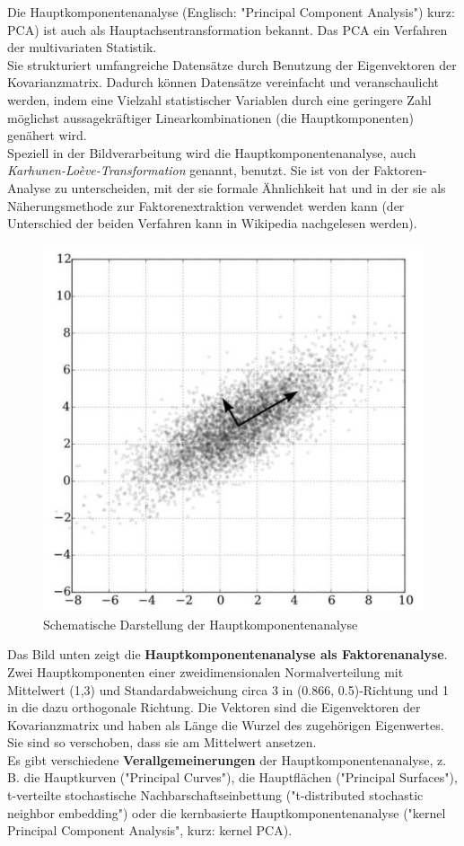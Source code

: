 \documentclass[12pt]{article}
\begin{document}
Die Hauptkomponentenanalyse (Englisch: "Principal Component Analysis") kurz: PCA) ist auch als Hauptachsentransformation bekannt. Das PCA  ein Verfahren der multivariaten Statistik.\\
Sie strukturiert umfangreiche Datensätze durch Benutzung der Eigenvektoren der Kovarianzmatrix. Dadurch können Datensätze vereinfacht und veranschaulicht werden, indem eine Vielzahl statistischer Variablen durch eine geringere Zahl möglichst aussagekräftiger Linearkombinationen (die Hauptkomponenten) genähert wird.\\
Speziell in der Bildverarbeitung wird die Hauptkomponentenanalyse, auch \textit{Karhunen-Loève-Transformation} genannt, benutzt. Sie ist von der Faktoren-Analyse zu unterscheiden, mit der sie formale Ähnlichkeit hat und in der sie als Näherungsmethode zur Faktorenextraktion verwendet werden kann (der Unterschied der beiden Verfahren kann in Wikipedia nachgelesen werden). \\[0.2cm]
\begin{figure}[h]
  \centering
  \includegraphics[width=0.6
  \textwidth]{Hauptkomponentenanalyse}
  \caption{Schematische Darstellung der Hauptkomponentenanalyse}
  \label{fig:HK_A}
\end{figure}
Das Bild unten zeigt die \textbf{Hauptkomponentenanalyse als Faktorenanalyse}.\\ Zwei Hauptkomponenten einer zweidimensionalen Normalverteilung mit Mittelwert (1,3) und Standardabweichung circa 3 in (0.866, 0.5)-Richtung und 1 in die dazu orthogonale Richtung. Die Vektoren sind die Eigenvektoren der Kovarianzmatrix und haben als Länge die Wurzel des zugehörigen Eigenwertes. Sie sind so verschoben, dass sie am Mittelwert ansetzen. \\[0.2cm]
Es gibt verschiedene \textbf{Verallgemeinerungen} der Hauptkomponentenanalyse, z. B. die Hauptkurven ("Principal Curves"), die Hauptflächen ("Principal Surfaces"), t-verteilte stochastische Nachbarschaftseinbettung ("t-distributed stochastic neighbor embedding") oder die kernbasierte Hauptkomponentenanalyse ("kernel Principal Component Analysis", kurz: kernel PCA).\\
\end{document}
